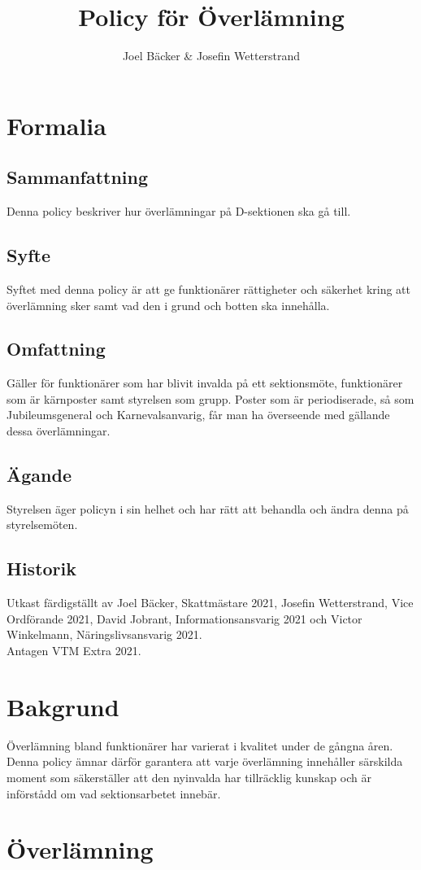 \documentclass[]{dsekprotokoll}
\title{Policy för Överlämning}
\author{Joel Bäcker \& Josefin Wetterstrand}
\begin{document}
\section{Formalia}
\subsection{Sammanfattning}
Denna policy beskriver hur överlämningar på D-sektionen ska gå till.

\subsection{Syfte}
Syftet med denna policy är att ge funktionärer rättigheter och säkerhet kring att överlämning sker samt vad den i grund och botten ska innehålla.

\subsection{Omfattning} %
Gäller för funktionärer som har blivit invalda på ett sektionsmöte, funktionärer som är kärnposter samt styrelsen som grupp. Poster som är periodiserade, så som Jubileumsgeneral och Karnevalsanvarig, får man ha överseende med gällande dessa överlämningar.

\subsection{Ägande}
Styrelsen äger policyn i sin helhet och har rätt att behandla och ändra denna på styrelsemöten.

\subsection{Historik}
Utkast färdigställt av Joel Bäcker, Skattmästare 2021, Josefin Wetterstrand, Vice Ordförande 2021, David Jobrant, Informationsansvarig 2021 och Victor Winkelmann, Näringslivsansvarig 2021.
\\ Antagen VTM Extra 2021. 
\section{Bakgrund}
Överlämning bland funktionärer har varierat i kvalitet under de gångna åren. Denna policy ämnar därför garantera att varje överlämning innehåller särskilda moment som säkerställer att den nyinvalda har tillräcklig kunskap och är införstådd om vad sektionsarbetet innebär.

\section{Överlämning}
\end{document}
